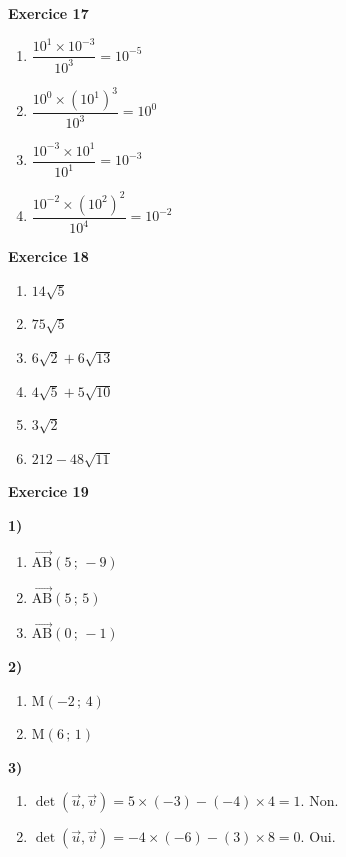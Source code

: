 \documentclass[12pt,a4paper,french]{article}
\begin{document}
\noindent\textbf{Exercice 17}\par
\smallskip
\begin{enumerate}
\item $\dfrac{10^{1} \times 10^{-3}}{10^{3}} = 10^{-5}$
\item $\dfrac{10^{0} \times (10^{1})^{3}}{10^{3}} = 10^{0}$
\item $\dfrac{10^{-3} \times 10^{1}}{10^{1}} = 10^{-3}$
\item $\dfrac{10^{-2} \times (10^{2})^{2}}{10^{4}} = 10^{-2}$
\end{enumerate}
\medskip

\noindent\textbf{Exercice 18}\par
\smallskip
\begin{enumerate}
\item $14 \sqrt{5}$
\item $75 \sqrt{5}$
\item $6 \sqrt{2} + 6 \sqrt{13}$
\item $4 \sqrt{5} + 5 \sqrt{10}$
\item $3 \sqrt{2}$
\item $212 - 48 \sqrt{11}$
\end{enumerate}
\medskip

\noindent\textbf{Exercice 19}\par
\smallskip
\textbf{1)}
\begin{enumerate}
\item $\overrightarrow{\ensuremath{\mathrm{A}}\ensuremath{\mathrm{B}}}(5\,;\,-9)$
\item $\overrightarrow{\ensuremath{\mathrm{A}}\ensuremath{\mathrm{B}}}(5\,;\,5)$
\item $\overrightarrow{\ensuremath{\mathrm{A}}\ensuremath{\mathrm{B}}}(0\,;\,-1)$
\end{enumerate}
\textbf{2)}
\begin{enumerate}
\item $\ensuremath{\mathrm{M}}\left(-2\,;\,4\right)$
\item $\ensuremath{\mathrm{M}}\left(6\,;\,1\right)$
\end{enumerate}
\textbf{3)}
\begin{enumerate}
\item $\det(\vec{u},\vec{v}) = 5\times(-3)-(-4)\times4 = 1$. Non.
\item $\det(\vec{u},\vec{v}) = -4\times(-6)-(3)\times8 = 0$. Oui.
\end{enumerate}
\medskip
\end{document}
